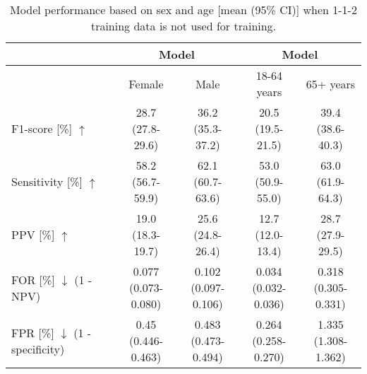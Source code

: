 {%
\begin{table}[h]
    \centering
    \caption{Model performance based on sex and age [mean (95\% CI)] when 1-1-2 training data is not used for training.}
    \label{tab_retrospective:tableA2}
    \begin{tabular}{l|cc|cc}
        \toprule

         & \multicolumn{2}{c|}{Model} & \multicolumn{2}{c}{Model} \\
        \midrule
         & Female & Male & 18-64 years & 65+ years \\

        \midrule

        F1-score [\%] $\uparrow$ & \makecell{28.7 \\ (27.8-29.6)} & \makecell{36.2 \\ (35.3-37.2)} & \makecell{20.5 \\ (19.5-21.5)} & \makecell{39.4 \\ (38.6-40.3)} \\
        \midrule
        Sensitivity [\%] $\uparrow$ & \makecell{58.2 \\ (56.7-59.9)} & \makecell{62.1 \\ (60.7-63.6)} & \makecell{53.0 \\ (50.9-55.0)} & \makecell{63.0 \\ (61.9-64.3)} \\
        \midrule
        PPV [\%] $\uparrow$ & \makecell{19.0 \\ (18.3-19.7)} & \makecell{25.6 \\ (24.8-26.4)} & \makecell{12.7 \\ (12.0-13.4)} & \makecell{28.7 \\ (27.9-29.5)} \\
        \midrule
        \makecell[l]{FOR [\%] $\downarrow$ \\ (1 - NPV)}  & \makecell{0.077 \\ (0.073-0.080)} & \makecell{0.102 \\ (0.097-0.106)} & \makecell{0.034 \\ (0.032-0.036)} & \makecell{0.318 \\ (0.305-0.331)} \\
        \midrule
        \makecell[l]{FPR [\%] $\downarrow$ \\ (1 - specificity)} & \makecell{0.45 \\ (0.446-0.463)} & \makecell{0.483 \\ (0.473-0.494)} & \makecell{0.264 \\ (0.258-0.270)} & \makecell{1.335 \\ (1.308-1.362)} \\


\end{tabular}
\end{table}}
